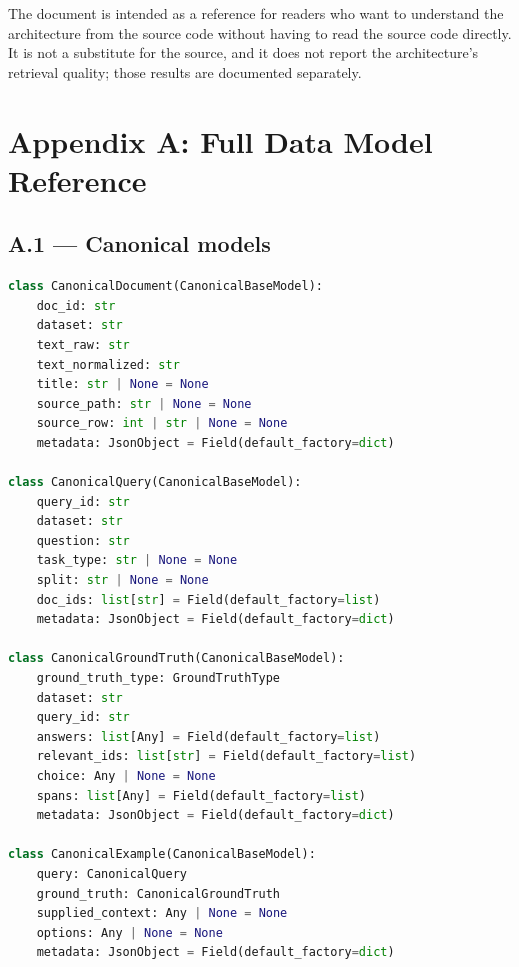 \documentclass[11pt,a4paper]{article}
\begin{document}
The document is intended as a reference for readers who want to
understand the architecture from the source code without having to
read the source code directly. It is not a substitute for the
source, and it does not report the architecture's retrieval quality;
those results are documented separately.

\appendix

\section{Appendix A: Full Data Model Reference}

\subsection{A.1 --- Canonical models}
\begin{lstlisting}[language=python]
class CanonicalDocument(CanonicalBaseModel):
    doc_id: str
    dataset: str
    text_raw: str
    text_normalized: str
    title: str | None = None
    source_path: str | None = None
    source_row: int | str | None = None
    metadata: JsonObject = Field(default_factory=dict)

class CanonicalQuery(CanonicalBaseModel):
    query_id: str
    dataset: str
    question: str
    task_type: str | None = None
    split: str | None = None
    doc_ids: list[str] = Field(default_factory=list)
    metadata: JsonObject = Field(default_factory=dict)

class CanonicalGroundTruth(CanonicalBaseModel):
    ground_truth_type: GroundTruthType
    dataset: str
    query_id: str
    answers: list[Any] = Field(default_factory=list)
    relevant_ids: list[str] = Field(default_factory=list)
    choice: Any | None = None
    spans: list[Any] = Field(default_factory=list)
    metadata: JsonObject = Field(default_factory=dict)

class CanonicalExample(CanonicalBaseModel):
    query: CanonicalQuery
    ground_truth: CanonicalGroundTruth
    supplied_context: Any | None = None
    options: Any | None = None
    metadata: JsonObject = Field(default_factory=dict)
\end{lstlisting}
\end{document}
